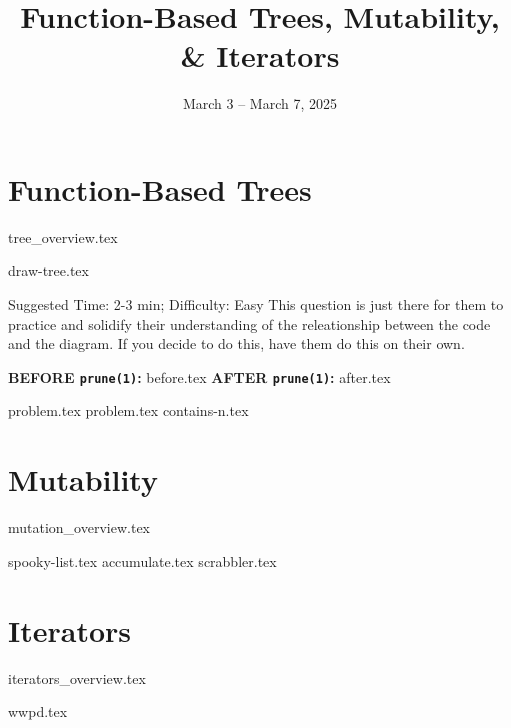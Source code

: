 \documentclass{exam}
\title{Function-Based Trees, Mutability, \& Iterators}
\date{March 3 -- March 7, 2025}
\begin{document}
\maketitle

\section{Function-Based Trees}
{tree_overview.tex}
\begin{questions}
    {draw-tree.tex}
    \begin{questionmeta}
        Suggested Time: 2-3 min; Difficulty: Easy
        This question is just there for them to practice and solidify their understanding of the releationship between the code and the diagram. 
        If you decide to do this, have them do this on their own.
    \end{questionmeta}
    \begin{blocksection} 
        \textbf{BEFORE \lstinline{prune(1)}:}
        {before.tex}
        \hspace{0.5in}
        \textbf{AFTER \lstinline{prune(1)}:}
        {after.tex}
    \end{blocksection}
    {problem.tex}
    {problem.tex}
    {contains-n.tex}
\end{questions}

\newpage
    
\section{Mutability}
{mutation_overview.tex}
\begin{questions}
    {spooky-list.tex}
    {accumulate.tex}
    \newpage
    {scrabbler.tex}
\end{questions}

\section{Iterators}
{iterators_overview.tex}
\begin{questions}
    {wwpd.tex}
\end{questions}
\end{document}
